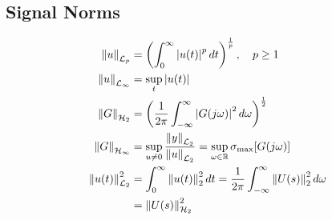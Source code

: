 \subsection{Signal Norms}
\vspace*{-1em}
\begin{align*}
    \left\| u \right\|_{\mathcal{L}_p} &= \left(\int_{0}^{\infty} \left\lvert u(t) \right\rvert^p dt \right)^{\frac{1}{p}}, \quad p \geq 1\\
    \left\| u \right\|_{\mathcal{L}_\infty} &= \sup_{t} \left\lvert u(t) \right\rvert\\
    \left\| G \right\|_{\mathcal{H}_2} &= \left(\frac{1}{2\pi}\int_{-\infty}^{\infty} \left\lvert G(j\omega) \right\rvert^2 d\omega \right)^{\frac{1}{2}}\\
    \left\| G \right\|_{\mathcal{H}_\infty} &= \sup_{u \neq 0} \frac{\left\| y \right\|_{\mathcal{L}_2}}{\left\| u \right\|_{\mathcal{L}_2}} 
    = \sup_{\omega \in \mathbb{R}} \sigma_{\max}[G(j\omega)]\\
    \left\| u(t) \right\|^2_{\mathcal{L}_2} &= \int_{0}^{\infty} \left\| u(t) \right\|^2_2 dt = \frac{1}{2\pi} \int_{-\infty}^{\infty} \left\| U(s) \right\|^2_2 d\omega\\
    &= \left\| U(s) \right\|^2_{\mathcal{H}_2}
\end{align*}